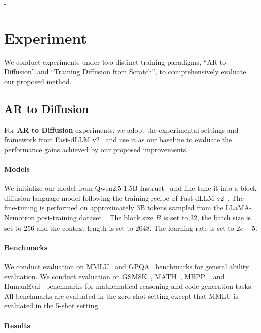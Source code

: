 -\section{Experiment}

We conduct experiments under two distinct training paradigms, ``AR to Diffusion'' and ``Training Diffusion from Scratch'', to comprehensively evaluate our proposed method.

\subsection{AR to Diffusion}

For \textbf{AR to Diffusion} experiments, we adopt the experimental settings and framework from Fast-dLLM v2~\citep{fastdllmv2} and use it as our baseline to evaluate the performance gains achieved by our proposed improvements.

\paragraph{Models}

We initialize our model from Qwen2.5-1.5B-Instruct~\citep{qwen2.5} and fine-tune it into a block diffusion language model following the training recipe of Fast-dLLM v2~\citep{fastdllmv2}.
The fine-tuning is performed on approximately 3B tokens sampled from the LLaMA-Nemotron post-training dataset~\citep{nemotronpost}.
The block size $B$ is set to 32, the batch size is set to $256$ and the context length is set to $2048$.
The learning rate is set to $2e-5$.

\paragraph{Benchmarks}

We conduct evaluation on MMLU~\citep{mmlu} and GPQA~\citep{gpqa} benchmarks for general ability evaluation.
We conduct evaluation on GSM8K~\citep{gsm8k}, MATH~\citep{math}, MBPP~\citep{mbpp}, and HumanEval~\citep{humaneval} benchmarks for mathematical reasoning and code generation tasks.
All benchmarks are evaluated in the zero-shot setting except that MMLU is evaluated in the 5-shot setting.

\paragraph{Results}

